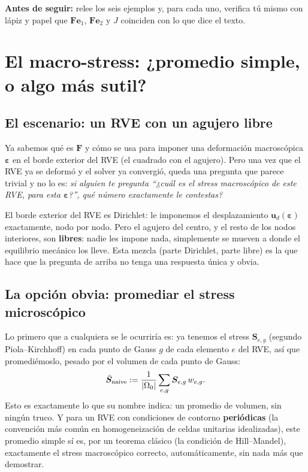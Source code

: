 \documentclass[11pt,a4paper]{article}
\begin{document}
\bigskip
\noindent\textbf{Antes de seguir:} relee los seis ejemplos y, para cada
uno, verifica t\'u mismo con l\'apiz y papel que $\bm F\bm e_1$,
$\bm F\bm e_2$ y $J$ coinciden con lo que dice el texto.

\section{El macro-stress: ¿promedio simple, o algo m\'as sutil?}
\label{ch:macrostress}

\subsection{El escenario: un RVE con un agujero libre}

Ya sabemos qu\'e es $\bm F$ y c\'omo se usa para imponer una deformaci\'on
macrosc\'opica $\bm\varepsilon$ en el borde exterior del RVE (el
cuadrado con el agujero). Pero una vez que el RVE ya se deform\'o y el
solver ya convergi\'o, queda una pregunta que parece trivial y no lo
es: \emph{si alguien te pregunta ``¿cu\'al es el stress macrosc\'opico
de este RVE, para esta $\bm\varepsilon$?'', qu\'e n\'umero exactamente
le contestas?}

El borde exterior del RVE es Dirichlet: le imponemos el desplazamiento
$\bm u_d(\bm\varepsilon)$ exactamente, nodo por nodo. Pero el agujero
del centro, y el resto de los nodos interiores, son \textbf{libres}:
nadie les impone nada, simplemente se mueven a donde el equilibrio
mec\'anico los lleve. Esta mezcla (parte Dirichlet, parte libre) es la
que hace que la pregunta de arriba no tenga una respuesta \'unica y
obvia.

\subsection{La opci\'on obvia: promediar el stress microsc\'opico}

Lo primero que a cualquiera se le ocurrir\'ia es: ya tenemos el stress
$\bm S_{e,g}$ (segundo Piola--Kirchhoff) en cada punto de Gauss $g$ de
cada elemento $e$ del RVE, as\'i que promedi\'emoslo, pesado por el
volumen de cada punto de Gauss:
\begin{equation}
 \bar{\bm S}_{\rm naive} := \frac{1}{|\Omega_0|}\sum_{e,g} \bm S_{e,g}\,w_{e,g}.
 \label{eq:appB-naive-average}
\end{equation}
Esto es exactamente lo que su nombre indica: un promedio de volumen,
sin ning\'un truco. Y para un RVE con condiciones de contorno
\textbf{peri\'odicas} (la convenci\'on m\'as com\'un en homogeneizaci\'on
de celdas unitarias idealizadas), este promedio simple s\'i es, por un
teorema cl\'asico (la condici\'on de Hill--Mandel), exactamente el
stress macrosc\'opico correcto, autom\'aticamente, sin nada m\'as que
demostrar.
\end{document}
